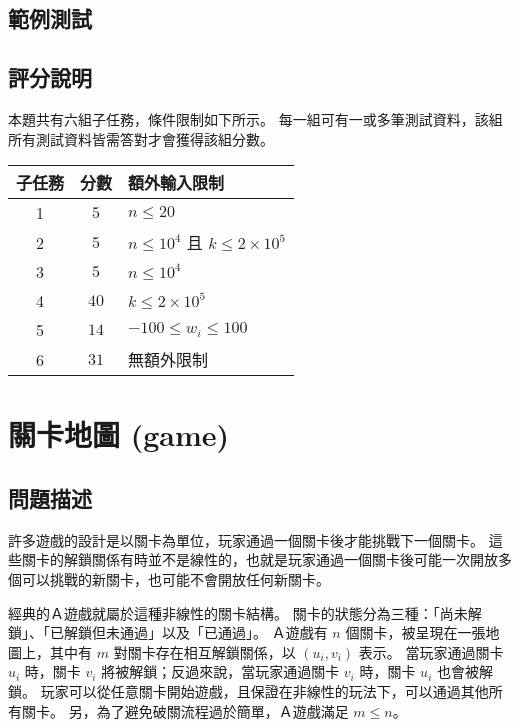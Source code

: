 \subsection{範例測試}

\begin{example}
%
%
%
\end{example}

\subsection{評分說明}

本題共有六組子任務，條件限制如下所示。
每一組可有一或多筆測試資料，該組所有測試資料皆需答對才會獲得該組分數。

\begin{longtable}[]{@{}ccl@{}}
\toprule
子任務 & 分數 & 額外輸入限制 \\
\midrule
\endhead
1 & \(5\) & \(n \le 20\) \\
2 & \(5\) & \(n \le 10^4\) 且 \(k \le 2\times 10^5\) \\
3 & \(5\) & \(n \le 10^4\) \\
4 & \(40\) & \(k \le 2\times 10^5\) \\
5 & \(14\) & \(-100 \le w_i \le 100\) \\
6 & \(31\) & 無額外限制 \\
\bottomrule
\end{longtable}

\section{關卡地圖 (game)}

\subsection{問題描述}

許多遊戲的設計是以關卡為單位，玩家通過一個關卡後才能挑戰下一個關卡。
這些關卡的解鎖關係有時並不是線性的，也就是玩家通過一個關卡後可能一次開放多個可以挑戰的新關卡，也可能不會開放任何新關卡。

經典的Ａ遊戲就屬於這種非線性的關卡結構。
關卡的狀態分為三種：「尚未解鎖」、「已解鎖但未通過」以及「已通過」。
Ａ遊戲有 \(n\) 個關卡，被呈現在一張地圖上，其中有 \(m\)
對關卡存在相互解鎖關係，以 \((u_i, v_i)\) 表示。 當玩家通過關卡 \(u_i\)
時，關卡 \(v_i\) 將被解鎖；反過來說，當玩家通過關卡 \(v_i\) 時，關卡
\(u_i\) 也會被解鎖。
玩家可以從任意關卡開始遊戲，且保證在非線性的玩法下，可以通過其他所有關卡。
另，為了避免破關流程過於簡單，Ａ遊戲滿足 \(m \le n\)。

